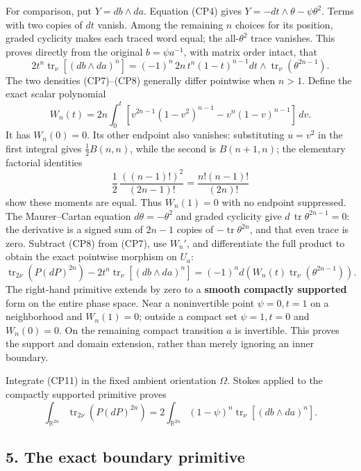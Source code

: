 \documentclass[
  11pt,
]{article}
\begin{document}
For comparison, put \(Y=db\wedge da\). Equation (CP4) gives
\(Y=-d t\wedge\theta-\psi\theta^2\). Terms with two copies of \(dt\)
vanish. Among the remaining \(n\) choices for its position, graded
cyclicity makes each traced word equal; the all-\(\theta^2\) trace
vanishes. This proves directly from the original \(b=\psi a^{-1}\), with
matrix order intact, that \[
 2t^n\operatorname{tr}_\nu[(db\wedge da)^n]
 =(-1)^n\,2n\,t^n(1-t)^{n-1}
       dt\wedge\operatorname{tr}_\nu(\theta^{2n-1}).
 \tag{CP8}
\] The two densities (CP7)--(CP8) generally differ pointwise when
\(n>1\). Define the exact scalar polynomial \[
 W_n(t)=2n\int_0^t
   \left[v^{2n-1}(1-v^2)^{n-1}
         -v^n(1-v)^{n-1}\right]\,dv .
 \tag{CP9}
\] It has \(W_n(0)=0\). Its other endpoint also vanishes: substituting
\(u=v^2\) in the first integral gives \(\tfrac12 B(n,n)\), while the
second is \(B(n+1,n)\); the elementary factorial identities \[
 \frac12\,\frac{((n-1)!)^2}{(2n-1)!}
 =\frac{n!(n-1)!}{(2n)!}
 \tag{CP10}
\] show these moments are equal. Thus \(W_n(1)=0\) with no endpoint
suppressed. The Maurer--Cartan equation \(d\theta=-\theta^2\) and graded
cyclicity give \(d\,\operatorname{tr}\theta^{2n-1}=0\): the derivative
is a signed sum of \(2n-1\) copies of \(-\operatorname{tr}\theta^{2n}\),
and that even trace is zero. Subtract (CP8) from (CP7), use \(W_n'\),
and differentiate the full product to obtain the exact pointwise
morphism on \(U_a\): \[
 \boxed{\displaystyle
 \operatorname{tr}_{2\nu}\!\left(P(dP)^{2n}\right)
 -2t^n\operatorname{tr}_\nu[(db\wedge da)^n]
 =(-1)^n d\!\left(
      W_n(t)\operatorname{tr}_\nu(\theta^{2n-1})\right).}
 \tag{CP11}
\] The right-hand primitive extends by zero to a \textbf{smooth
compactly supported} form on the entire phase space. Near a
noninvertible point \(\psi=0,t=1\) on a neighborhood and \(W_n(1)=0\);
outside a compact set \(\psi=1,t=0\) and \(W_n(0)=0\). On the remaining
compact transition \(a\) is invertible. This proves the support and
domain extension, rather than merely ignoring an inner boundary.

Integrate (CP11) in the fixed ambient orientation \(\Omega\). Stokes
applied to the compactly supported primitive proves \[
 \int_{\mathbb R^{2n}}\operatorname{tr}_{2\nu}
        \!\left(P(dP)^{2n}\right)
   =2\int_{\mathbb R^{2n}}
       (1-\psi)^n\operatorname{tr}_{\nu}[(db\wedge da)^n].
 \tag{CP12}
\]

\subsection{5. The exact boundary
primitive}\label{the-exact-boundary-primitive}
\end{document}
